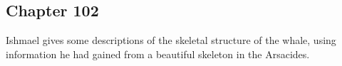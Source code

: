 \subsection{Chapter 102}

Ishmael gives some descriptions of the skeletal structure of the whale, using
information he had gained from a beautiful skeleton in the Arsacides.
